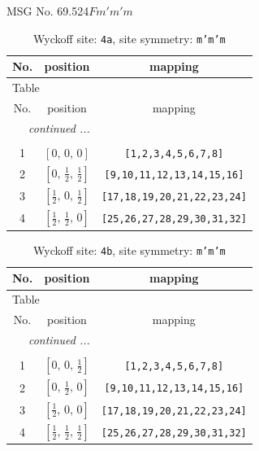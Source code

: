 \documentclass[fleqn,8pt]{jsarticle}
\begin{document}
\setcounter{MaxMatrixCols}{32}

\renewcommand{\tablename}{Table~}
\renewcommand{\figurename}{Figure~}
\begin{center}
\LARGE
MSG No. 69.524\quad$Fm'm'm$
\end{center}
\renewcommand{\arraystretch}{1.2}
\begin{longtable}{ccc}
\caption{Wyckoff site: {\tt 4a}, site symmetry: {\tt m'm'm}}
 \\
 \hline \hline
No. & position & mapping \\ \hline \endfirsthead

\multicolumn{2}{l}{\tablename\ \thetable{}} \\
 \hline \hline
No. & position & mapping \\ \hline \endhead

 \hline \hline
\multicolumn{2}{r}{\footnotesize\it continued ...} \\ \endfoot

 \hline \hline
\multicolumn{2}{r}{} \\ \endlastfoot

1 & $\left[ 0,\, 0,\, 0 \right]$ & {\tt [1,2,3,4,5,6,7,8]} \\ \hline
2 & $\left[ 0,\, \frac{1}{2},\, \frac{1}{2} \right]$ & {\tt [9,10,11,12,13,14,15,16]} \\ \hline
3 & $\left[ \frac{1}{2},\, 0,\, \frac{1}{2} \right]$ & {\tt [17,18,19,20,21,22,23,24]} \\ \hline
4 & $\left[ \frac{1}{2},\, \frac{1}{2},\, 0 \right]$ & {\tt [25,26,27,28,29,30,31,32]} \\
\end{longtable}
\renewcommand{\arraystretch}{1.2}
\begin{longtable}{ccc}
\caption{Wyckoff site: {\tt 4b}, site symmetry: {\tt m'm'm}}
 \\
 \hline \hline
No. & position & mapping \\ \hline \endfirsthead

\multicolumn{2}{l}{\tablename\ \thetable{}} \\
 \hline \hline
No. & position & mapping \\ \hline \endhead

 \hline \hline
\multicolumn{2}{r}{\footnotesize\it continued ...} \\ \endfoot

 \hline \hline
\multicolumn{2}{r}{} \\ \endlastfoot

1 & $\left[ 0,\, 0,\, \frac{1}{2} \right]$ & {\tt [1,2,3,4,5,6,7,8]} \\ \hline
2 & $\left[ 0,\, \frac{1}{2},\, 0 \right]$ & {\tt [9,10,11,12,13,14,15,16]} \\ \hline
3 & $\left[ \frac{1}{2},\, 0,\, 0 \right]$ & {\tt [17,18,19,20,21,22,23,24]} \\ \hline
4 & $\left[ \frac{1}{2},\, \frac{1}{2},\, \frac{1}{2} \right]$ & {\tt [25,26,27,28,29,30,31,32]} \\
\end{longtable}
\end{document}
